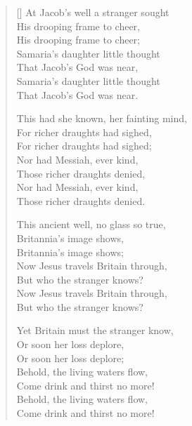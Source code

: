   \pagebreak
  \begin{verse}[\versewidth]
  At Jacob's well a stranger sought\\
  His drooping frame to cheer,\\
  His drooping frame to cheer;\\
  Samaria's daughter little thought\\
  That Jacob's God was near,\\
  Samaria's daughter little thought\\
  That Jacob's God was near.
  
  This had she known, her fainting mind,\\
  For richer draughts had sighed,\\
  For richer draughts had sighed;\\
  Nor had Messiah, ever kind,\\
  Those richer draughts denied,\\
  Nor had Messiah, ever kind,\\
  Those richer draughts denied.
  
  This ancient well, no glass so true,\\
  Britannia's image shows,\\
  Britannia's image shows;\\
  Now Jesus travels Britain through,\\
  But who the stranger knows?\\
  Now Jesus travels Britain through,\\
  But who the stranger knows?  
  
  Yet Britain must the stranger know,\\
  Or soon her loss deplore,\\
  Or soon her loss deplore;\\
  Behold, the living waters flow,\\
  Come drink and thirst no more!\\
  Behold, the living waters flow,\\
  Come drink and thirst no more!
  \end{verse}
